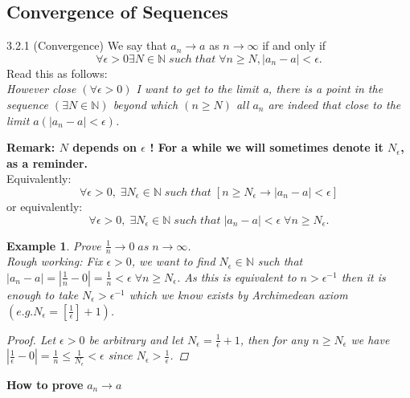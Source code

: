 \documentclass[a4paper]{article}
\def\nn{{\mathbb N}}
\newtheorem{example}{Example}[subsection]
\begin{document}
\subsection{Convergence of Sequences}
\begin{definition}{3.2.1 (Convergence)}{}
    We say that $a_n\rightarrow a$ as $n\rightarrow \infty$ if and only if 
    \begin{equation*}
        \forall \epsilon >0 \exists N \in \nn \; such\; that\; \forall n \geq N, |a_n-a|<\epsilon . 
    \end{equation*}
    Read this as follows:\\
    \textit{However close $(\forall \epsilon >0)$ I want to get to the limit a, there is a point in the sequence $(\exists N \in \nn)$ beyond which $(n\geq N)$ all $a_n$ are indeed that close to the limit $a(|a_n-a|<\epsilon)$.}
\end{definition}
\textbf{Remark: $N$ depends on $\epsilon$ ! For a while we will sometimes denote it $N_\epsilon$, as a reminder.}\\
Equivalently:
\begin{equation*}
    \forall \epsilon>0,\; \exists N_\epsilon \in \nn \;such \;that\; [n\geq N_\epsilon \rightarrow |a_n-a|<\epsilon]
\end{equation*}
or equivalently:
\begin{equation*}
    \forall \epsilon >0,\; \exists N_\epsilon \in \nn \; such \; that\; |a_n-a|<\epsilon \; \forall n\geq N_\epsilon.
\end{equation*}
\begin{example}
    Prove $\frac{1}{n}\rightarrow 0 \;as \; n\rightarrow \infty$. \\
    \textit{Rough working:} Fix $\epsilon>0$, we want to find $N_\epsilon \in \nn$ such that $|a_n-a|=|\frac{1}{n}-0|=\frac{1}{n}<\epsilon \; \forall n\geq N_\epsilon$. As this is equivalent to $n>\epsilon^{-1}$ then it is enough to take $N_\epsilon >\epsilon^{-1}$ which we know exists by Archimedean axiom $(e.g. N_\epsilon=[\frac{1}{\epsilon}]+1)$. 
    \begin{proof}
        Let $\epsilon>0$ be arbitrary  and let $N_\epsilon=\frac{1}{\epsilon}+1$, then for any $n\geq N_\epsilon$ we have $|\frac{1}{\epsilon}-0|=\frac{1}{n}\leq \frac{1}{N_\epsilon}<\epsilon$ since $N_\epsilon >\frac{1}{\epsilon}$.
    \end{proof}
\end{example}
\textsf{\textbf{How to prove} $a_n\rightarrow a$}\\
\begin{center}
    \fbox{
        $\forall \epsilon >0,\;\exists N_\epsilon \in \nn \; such \; that \; |a_n-a|<\epsilon \; \forall n \geq N_\epsilon$
    }
\end{center}
\end{document}
